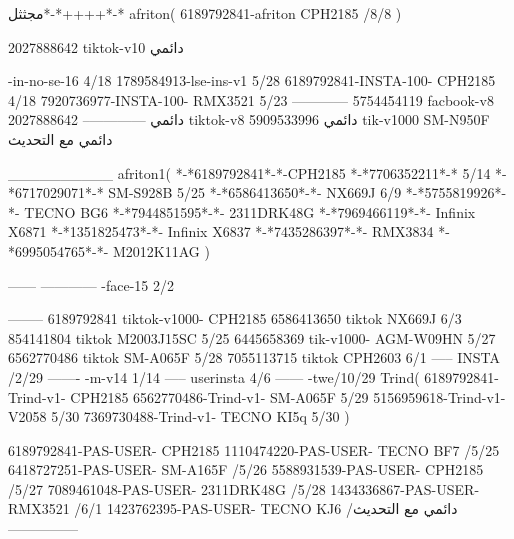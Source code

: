 مجثثل*-*++++*-*
afriton(
6189792841-afriton CPH2185  /8/8
)

2027888642 tiktok-v10
دائمي

-in-no-se-16 4/18
1789584913-lse-ins-v1 5/28
6189792841-INSTA-100- CPH2185 4/18
7920736977-INSTA-100- RMX3521 5/23
------------
5754454119 facbook-v8
دائمي
--------------
2027888642 tiktok-v8
دائمي
5909533996 tik-v1000  SM-N950F
دائمي مع التحديث

__________
afriton1(
*-*6189792841*-*-CPH2185
*-*7706352211*-* 5/14
*-*6717029071*-*  SM-S928B 5/25
*-*6586413650*-*- NX669J  6/9
*-*5755819926*-*-   TECNO BG6  \5
*-*7944851595*-*-   2311DRK48G  \5
*-*7969466119*-*-   Infinix X6871  \5
*-*1351825473*-*-   Infinix X6837  \5
*-*7435286397*-*-   RMX3834  \5
*-*6995054765*-*-   M2012K11AG  \5
)


------
------------
-face-15 2/2

--------
6189792841 tiktok-v1000- CPH2185 
6586413650 tiktok NX669J  6/3
854141804 tiktok M2003J15SC   5/25
6445658369 tik-v1000- AGM-W09HN  5/27
6562770486 tiktok  SM-A065F   5/28
7055113715 tiktok  CPH2603   6/1
-----
 INSTA /2/29
-------
-m-v14 1/14
-----
userinsta 4/6
------
-twe/10/29
Trind(
6189792841-Trind-v1- CPH2185 
6562770486-Trind-v1- SM-A065F   5/29
5156959618-Trind-v1- V2058   5/30
7369730488-Trind-v1- TECNO KI5q   5/30
)


6189792841-PAS-USER- CPH2185 
1110474220-PAS-USER-  TECNO BF7  /5/25
6418727251-PAS-USER-  SM-A165F  /5/26
5588931539-PAS-USER-  CPH2185  /5/27
7089461048-PAS-USER-  2311DRK48G  /5/28
1434336867-PAS-USER-  RMX3521  /6/1
1423762395-PAS-USER- TECNO KJ6  /دائمي مع التحديث
    ---------------
